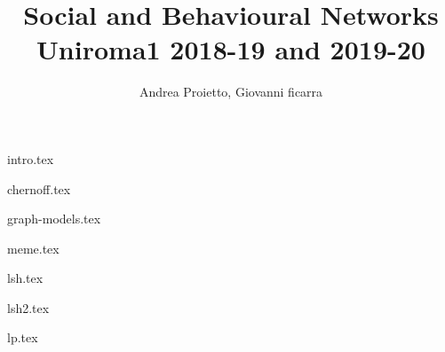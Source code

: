 \documentclass{report}
\title{
    Social and Behavioural Networks \\
    \large Uniroma1 2018-19 and 2019-20
}
\author{Andrea Proietto, Giovanni ficarra}
\begin{document}
\maketitle

\tableofcontents


{intro.tex}

{chernoff.tex}

{graph-models.tex}

{meme.tex}
	
{lsh.tex}

{lsh2.tex}

{lp.tex}



\end{document}
